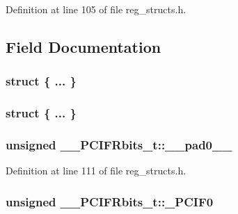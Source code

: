 Definition at line 105 of file reg\+\_\+structs.\+h.



\subsection{Field Documentation}
\hypertarget{union_____p_c_i_f_rbits__t_a37db14778ccc77487a3de8ca29764428}{\subsubsection[{"@21}]{\setlength{\rightskip}{0pt plus 5cm}struct \{ ... \} }}\label{union_____p_c_i_f_rbits__t_a37db14778ccc77487a3de8ca29764428}
\hypertarget{union_____p_c_i_f_rbits__t_a631f7a9073b5ad9ce7fb74e8dfe7ee75}{\subsubsection[{"@23}]{\setlength{\rightskip}{0pt plus 5cm}struct \{ ... \} }}\label{union_____p_c_i_f_rbits__t_a631f7a9073b5ad9ce7fb74e8dfe7ee75}
\hypertarget{union_____p_c_i_f_rbits__t_a78240d012f7f1cbb62559feffc6dc21a}{
\subsubsection[{\+\_\+\+\_\+pad0\+\_\+\+\_\+}]{\setlength{\rightskip}{0pt plus 5cm}unsigned \+\_\+\+\_\+\+P\+C\+I\+F\+Rbits\+\_\+t\+::\+\_\+\+\_\+pad0\+\_\+\+\_\+}}\label{union_____p_c_i_f_rbits__t_a78240d012f7f1cbb62559feffc6dc21a}


Definition at line 111 of file reg\+\_\+structs.\+h.

\hypertarget{union_____p_c_i_f_rbits__t_a0782c74fd65113393df42a21af950b66}{
\subsubsection[{\+\_\+\+P\+C\+I\+F0}]{\setlength{\rightskip}{0pt plus 5cm}unsigned \+\_\+\+\_\+\+P\+C\+I\+F\+Rbits\+\_\+t\+::\+\_\+\+P\+C\+I\+F0}}\label{union_____p_c_i_f_rbits__t_a0782c74fd65113393df42a21af950b66}


